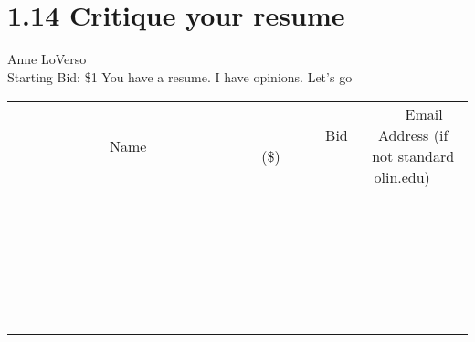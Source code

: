 \documentclass[11pt]{article}
\begin{document}
\section*{1.14 Critique your resume}
Anne LoVerso
\\
Starting Bid: \$1
\newline
You have a resume.  I have opinions.  Let's go
\\[6ex]
\begin{tabular}{c c c}
~~~~~~~~~~~~~Name~~~~~~~~~~~~~ & ~~~~~~~~~Bid (\$)~~~~~~~~~  & ~~~Email Address (if not standard olin.edu)~~~\\
 & & \\
\hline
 & & \\
\hline
 & & \\
\hline
 & & \\
\hline
 & & \\
\hline
 & & \\
\hline
 & & \\
\hline
 & & \\
\hline
 & & \\
\hline
 & & \\
\hline
 & & \\
\hline
 & & \\
\hline
 & & \\
\hline
 & & \\
\hline
 & & \\
\hline
 & & \\
\hline
 & & \\
\hline
 & & \\
\hline
 & & \\
\hline
 & & \\
\hline
 & & \\
\hline
 & & \\
\hline
 & & \\
\hline
 & & \\
\hline
 & & \\
\hline
 & & \\
\hline
\end{tabular}
\newpage
\end{document}
